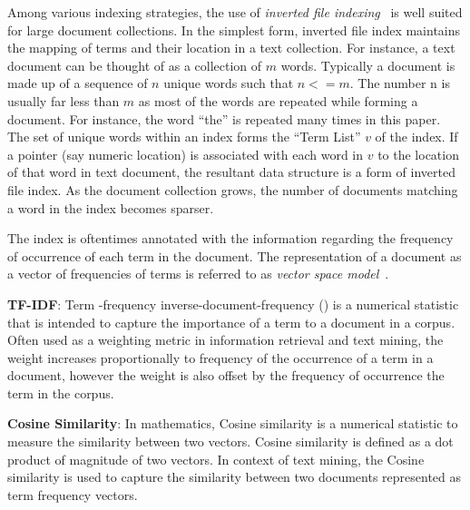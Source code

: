 Among various indexing strategies,
the use of \textit{inverted file indexing}~\cite{frakes1992introduction}
is well suited for large document collections.
In the simplest form, inverted file index maintains the
mapping of terms and their location in a text collection.
For instance, a text document can be thought of as a collection of $m$ words.
Typically a document is made up of a sequence of $n$ unique words
such that $n <= m$.
The number n is usually far less than
$m$ as most of the words are repeated while forming a document. 
For instance, the word ``the'' is repeated many times in this paper.
The set of unique words within an index forms
the ``Term List'' $v$ of the index.
If a pointer (say numeric location) is associated with each word in $v$ to the location
of that word in text document, the resultant data structure
is a form of inverted file index.
As the document collection grows,
the number of documents matching a word in the index becomes sparser.

The index is oftentimes annotated with the information regarding 
the frequency of occurrence of each term in the document. 
The representation of a document as a vector of frequencies
of terms is referred to as \textit{vector space model}~\cite{singhal2001modern,frakes1992introduction}.

\textbf{TF-IDF}\cite{manning2008introduction}:
Term -frequency inverse-document-frequency () is a numerical statistic that is intended to capture the importance of a term to a document in a corpus.
Often used as a weighting metric in information retrieval and text mining,
the  weight increases proportionally to frequency of the occurrence of a term in a document, however the weight is also offset by the frequency of occurrence the term in the corpus.

\textbf{Cosine Similarity}\cite{singhal2001modern}: In mathematics, Cosine similarity is a numerical statistic to measure the similarity between two vectors.
Cosine similarity is defined as a dot product of magnitude of two vectors.
In context of text mining, the Cosine similarity is used to capture the similarity between two documents represented as term frequency vectors.

